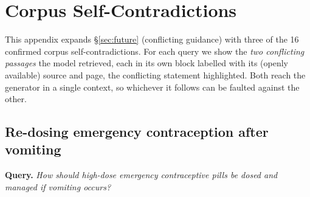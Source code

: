 \section{Corpus Self-Contradictions}
\label{app:contradictions}
\setlength{\emergencystretch}{2em}

This appendix expands \S\ref{sec:future} (conflicting guidance) with three of the 16 confirmed corpus self-contradictions. For each query we show the \emph{two conflicting passages} the model retrieved, each in its own block labelled with its (openly available) source and page, the conflicting statement highlighted. Both reach the generator in a single context, so whichever it follows can be faulted against the other.

\subsection*{Re-dosing emergency contraception after vomiting}
\noindent\textbf{Query.} \emph{How should high-dose emergency contraceptive pills be dosed and managed if vomiting occurs?}

